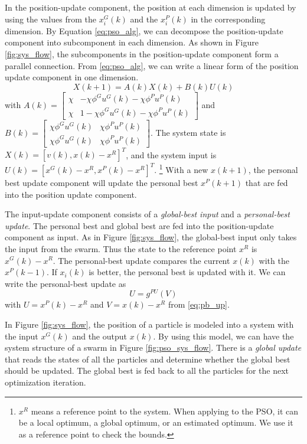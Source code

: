 In the position-update component, the position at each dimension is updated by using the values from the $ x^{G}_{i}(k) $ and the $ x^{P}_{i}(k) $ in the corresponding dimension.
By Equation \eqref{eq:pso_alg}, we can decompose the position-update component into subcomponent in each dimension.
As shown in Figure \ref{fig:sys_flow}, the subcomponents in the position-update component form a parallel connection.
From \eqref{eq:pso_alg}, we can write a linear form of the position update component in one dimension.
\begin{equation}
\label{eq:pso_up_linalg_simp}
X(k+1) = A(k) X(k) + B(k) U(k)
\end{equation}
with
$ A(k) = \begin{bmatrix}
\chi & - \chi \phi^{G} u^{G}(k) - \chi \phi^{P} u^{P}(k)
\\ 
\chi & 1 - \chi \phi^{G} u^{G}(k) - \chi \phi^{P} u^{P}(k)
\end{bmatrix} $
and
$ B(k) = \begin{bmatrix}
\chi \phi^{G} u^{G}(k) & \chi \phi^{P} u^{P}(k)
\\ 
\chi \phi^{G} u^{G}(k) & \chi \phi^{P} u^{P}(k)
\end{bmatrix} $.
The system state is $ X(k) = [ v(k), x(k) - x^{R} ]^{T} $, and the system input is $ U(k) = [ x^{G}(k) - x^{R} , x^{P}(k) - x^{R} ]^{T} $.
\footnote{$ x^{R} $ means a reference point to the system.
When applying to the PSO, it can be a local optimum, a global optimum, or an estimated optimum.
We use it as a reference point to check the bounds.}
With a new $ x(k+1) $, the personal best update component will update the personal best $ x^{P}(k+1) $ that are fed into the position update component.

The input-update component consists of a \emph{global-best input} and a \emph{personal-best update}.
The personal best and global best are fed into the position-update component as input.
As in Figure \ref{fig:sys_flow}, the global-best input only takes the input from the swarm.
Thus the state to the reference point $ x^{R} $ is $  x^{G}(k) - x^{R} $.
The personal-best update compares the current $ x(k) $ with the $ x^{P}(k-1) $.
If  $ x_{i}(k) $ is better, the personal best is updated with it.
We can write the personal-best update as 
\begin{equation}
\label{eq:pso_input_up}
U = g^{PU}(V)
\end{equation}
with $ U = x^{P}(k) - x^{R} $ 
and $ V = x(k) - x^{R} $
from \eqref{eq:pb_up}. 

In Figure \ref{fig:sys_flow}, the position of a particle is modeled into a system with the input $ x^{G}(k) $ and the output $ x(k) $.
By using this model, we can have the system structure of a swarm in Figure \ref{fig:pso_sys_flow}.
There is a \emph{global update} that reads the states of all the particles and determine whether the global best should be updated.
The global best is fed back to all the particles for the next optimization iteration.

